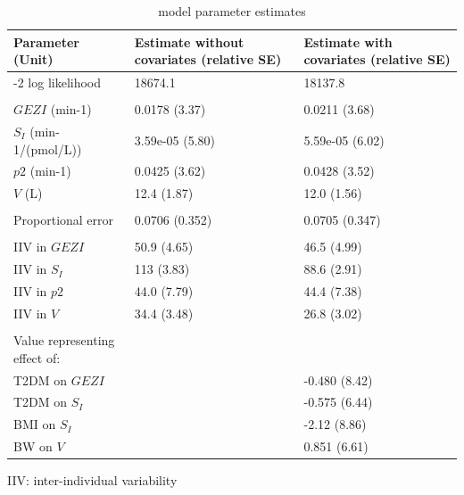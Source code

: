 \documentclass[utf8]{frontiersSCNS} %
\begin{document}
\begin{table}[h]
\caption{model parameter estimates}
\label{tab:prm estimates}
\begin{tabular}{lll}
\hline
Parameter (Unit)    & Estimate without covariates (relative SE) & Estimate with covariates (relative SE) \\ \hline
-2 log likelihood             & 18674.1       & 18137.8       \\
                              &               &               \\
$GEZI$ (min-1)                  & 0.0178 (3.37) & 0.0211 (3.68) \\
$S_I$ (min-1/(pmol/L)) & 3.59e-05 (5.80)                          & 5.59e-05 (6.02)                        \\
$p2$ (min-1)                    & 0.0425 (3.62) & 0.0428 (3.52) \\
$V$ (L)                         & 12.4 (1.87)   & 12.0 (1.56)   \\
                              &               &               \\
Proportional error  & 0.0706 (0.352)                            & 0.0705 (0.347)                         \\
                              &               &               \\
IIV in $GEZI$                      & 50.9 (4.65)   & 46.5 (4.99)   \\
IIV in $S_I$                        & 113 (3.83)    & 88.6 (2.91)   \\
IIV in $p2$                        & 44.0 (7.79)   & 44.4 (7.38)   \\
IIV in $V$                         & 34.4 (3.48)   & 26.8 (3.02)   \\
                              &               &               \\
Value representing effect of: &               &               \\
T2DM on $GEZI$                  &               & -0.480 (8.42) \\
T2DM on $S_I$                     &               & -0.575 (6.44) \\
BMI on $S_I$                     &               & -2.12 (8.86)  \\
BW on $V$                       &               & 0.851 (6.61)  \\ \hline
\end{tabular}
IIV: inter-individual variability
\end{table}
\end{document}
